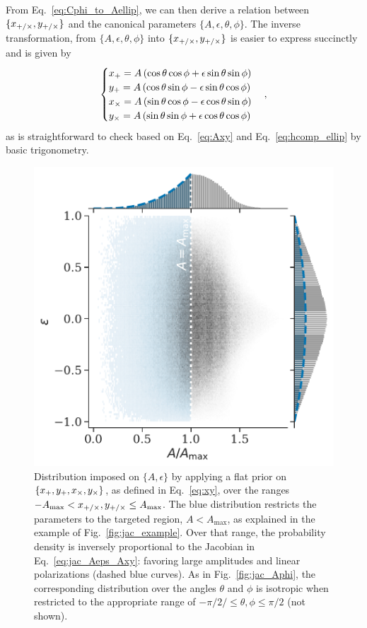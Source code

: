 \documentclass[aps,prd,twocolumn,superscriptaddress,preprintnumbers,floatfix,nofootinbib]{revtex4-2}
\newcommand*{\eq}[1]{Eq.~\eqref{eq:#1}}
\begin{document}
From \eq{Cphi_to_Aellip}, we can then derive a relation between $\{x_{+/\times}, y_{+/\times}\}$ and the canonical parameters $\{A,\epsilon,\theta,\phi\}$.
The inverse transformation, from  $\{A,\epsilon,\theta,\phi\}$ into $\{x_{+/\times}, y_{+/\times}\}$ is easier to express succinctly and is given by
\begin{equation} \label{eq:Axy_to_Cphi}
\begin{cases}
x_{+} = A \left(\cos\theta \cos\phi + \epsilon \sin\theta \sin\phi\right)\\
y_{+} = A \left(\cos\theta \sin\phi - \epsilon \sin\theta \cos\phi\right)\\
x_{\times} = A \left(\sin\theta \cos\phi - \epsilon \cos\theta \sin\phi\right)\\
y_{\times} = A \left(\sin\theta \sin\phi + \epsilon \cos\theta \cos\phi\right)
\end{cases} ,
\end{equation}
as is straightforward to check based on \eq{Axy} and \eq{hcomp_ellip} by basic trigonometry.

\begin{figure}
\includegraphics[width=\columnwidth]{jac_Aeps_Axy}
\caption{Distribution imposed on $\{A,\epsilon\}$ by applying a flat prior on $\{x_{+}, y_{+}, x_{\times}, y_{\times}\}$, as defined in \eq{xy}, over the ranges $- A_{\max} < x_{+/\times},y_{+/\times} \leq A_{\max}$.
The blue distribution restricts the parameters to the targeted region, $A < A_{\max}$, as explained in the example of Fig.~\ref{fig:jac_example}.
Over that range, the probability density is inversely proportional to the Jacobian in \eq{jac_Aeps_Axy}: favoring large amplitudes and linear polarizations (dashed blue curves).
As in Fig.~\ref{fig:jac_Aphi}, the corresponding distribution over the angles $\theta$ and $\phi$ is isotropic when restricted to the appropriate range of $-\pi/2/ \leq \theta,\phi \leq \pi/2$ (not shown).
}
\label{fig:jac_Axy}
\end{figure}
\end{document}
